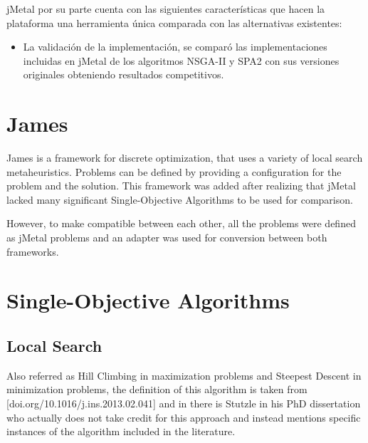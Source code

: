 jMetal por su parte cuenta con las siguientes características que hacen la plataforma una herramienta única comparada con las alternativas existentes:

\begin{itemize}
\item La validación de la implementación, se comparó las implementaciones incluidas en jMetal de los algoritmos NSGA-II y SPA2 con sus versiones originales obteniendo resultados competitivos.\\
\end{itemize}

\section{James}
James is a framework for discrete optimization, that uses a variety of local search metaheuristics. Problems can be defined by providing a configuration for the problem and the solution. This framework was added after realizing that jMetal lacked many significant Single-Objective Algorithms to be used for comparison. 

However, to make compatible between each other, all the problems were defined as jMetal problems and an adapter was used for conversion between both frameworks.



\section{Single-Objective Algorithms}


\subsection{Local Search}
 
Also referred as Hill Climbing in maximization problems and Steepest Descent in minimization problems, the definition of this algorithm is taken from [doi.org/10.1016/j.ins.2013.02.041] and in there is Stutzle in his PhD dissertation who actually does not take credit for this approach and instead mentions specific instances of the algorithm included in the literature.

